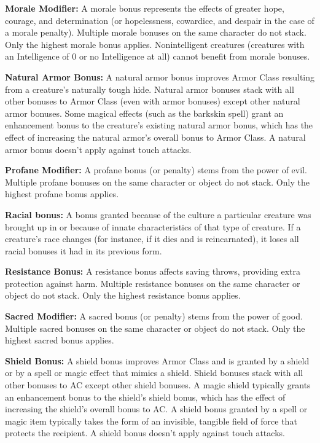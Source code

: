\textbf{Morale Modifier:} A morale bonus represents the effects of greater hope, courage, and determination (or hopelessness, cowardice, and despair in the case of a morale penalty). Multiple morale bonuses on the same character do not stack. Only the highest morale bonus applies. Nonintelligent creatures (creatures with an Intelligence of 0 or no Intelligence at all) cannot benefit from morale bonuses.

\textbf{Natural Armor Bonus:} A natural armor bonus improves Armor Class resulting from a creature's naturally tough hide. Natural armor bonuses stack with all other bonuses to Armor Class (even with armor bonuses) except other natural armor bonuses. Some magical effects (such as the barkskin spell) grant an enhancement bonus to the creature's existing natural armor bonus, which has the effect of increasing the natural armor's overall bonus to Armor Class. A natural armor bonus doesn't apply against touch attacks.

\textbf{Profane Modifier:} A profane bonus (or penalty) stems from the power of evil. Multiple profane bonuses on the same character or object do not stack. Only the highest profane bonus applies.

\textbf{Racial bonus:} A bonus granted because of the culture a particular creature was brought up in or because of innate characteristics of that type of creature. If a creature's race changes (for instance, if it dies and is reincarnated), it loses all racial bonuses it had in its previous form.

\textbf{Resistance Bonus:} A resistance bonus affects saving throws, providing extra protection against harm. Multiple resistance bonuses on the same character or object do not stack. Only the highest resistance bonus applies.

\textbf{Sacred Modifier:} A sacred bonus (or penalty) stems from the power of good. Multiple sacred bonuses on the same character or object do not stack. Only the highest sacred bonus applies.

\textbf{Shield Bonus:} A shield bonus improves Armor Class and is granted by a shield or by a spell or magic effect that mimics a shield. Shield bonuses stack with all other bonuses to AC except other shield bonuses. A magic shield typically grants an enhancement bonus to the shield's shield bonus, which has the effect of increasing the shield's overall bonus to AC. A shield bonus granted by a spell or magic item typically takes the form of an invisible, tangible field of force that protects the recipient. A shield bonus doesn't apply against touch attacks.

